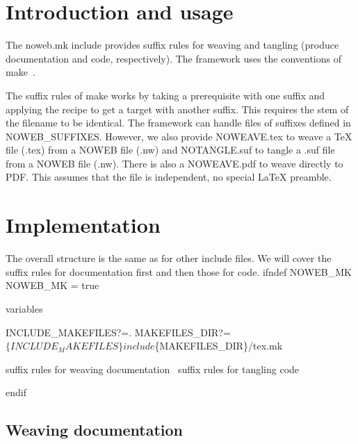 \section{Introduction and usage}%

The {\Tt{}noweb.mk\nwendquote} include provides suffix rules for weaving and tangling 
(produce documentation and code, respectively).
The framework uses the conventions of make~\cite[Section~10.2]{GNUMake}.

The suffix rules of make works by taking a prerequisite with one suffix and 
applying the recipe to get a target with another suffix.
This requires the stem of the filename to be identical.
The framework can handle files of suffixes defined in {\Tt{}NOWEB{\_}SUFFIXES\nwendquote}.
However, we also provide {\Tt{}NOWEAVE.tex\nwendquote} to weave a TeX file ({\Tt{}.tex\nwendquote}) from a 
NOWEB file ({\Tt{}.nw\nwendquote}) and {\Tt{}NOTANGLE.suf\nwendquote} to tangle a {\Tt{}.suf\nwendquote} file from a 
NOWEB file ({\Tt{}.nw\nwendquote}).
There is also a {\Tt{}NOWEAVE.pdf\nwendquote} to weave directly to PDF.
This assumes that the file is independent, \ie no special LaTeX preamble.


\section{Implementation}

The overall structure is the same as for other include files.
We will cover the suffix rules for documentation first and then those for code.
\endmoddef\nwstartdeflinemarkup\nwenddeflinemarkup
ifndef NOWEB_MK
NOWEB_MK = true

\LA{}variables~{\nwtagstyle{}}\RA{}

INCLUDE_MAKEFILES?=.
MAKEFILES_DIR?=$\{INCLUDE_MAKEFILES\}
include $\{MAKEFILES_DIR\}/tex.mk

\LA{}suffix rules for weaving documentation~{\nwtagstyle{}}\RA{}
\LA{}suffix rules for tangling code~{\nwtagstyle{}}\RA{}

endif
\nwendcode{}\nwdocspar

\subsection{Weaving documentation}

